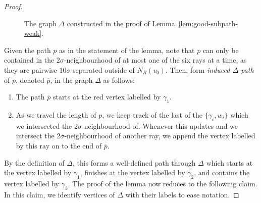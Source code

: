 \documentclass[11pt,a4paper]{amsart}
\theoremstyle{definition}
\begin{document}
\begin{proof}
\begin{figure}[ht]

        \caption{The graph $\Delta$ constructed in the proof of Lemma~\ref{lem:good-subpath-weak}.}
        \label{fig:graph-delta}
    \end{figure}

    Given the path $p$ as in the statement of the lemma, note that $p$ can only be contained in the $2\sigma$-neighbourhood of at most one of the six rays at a time, as they are pairwise $10\sigma$-separated outside of $N_R(v_0)$. 
    Then, form \emph{induced $\Delta$-path} of $p$, denoted $\overline p$, in the graph $\Delta$ as follows:
    \begin{enumerate}
        \item The path $\overline p$ starts at the red vertex labelled by $\gamma_1$.

        \item As we travel the length of $p$, we keep track of the last of the $\{\gamma_i, w_i\}$ which we intersected the $2\sigma$-neighbourhood of. 
            Whenever this updates and we intersect the $2\sigma$-neighbourhood of another ray, we append the vertex labelled by this ray on to the end of $\overline p$.
    \end{enumerate}
    By the definition of $\Delta$, this forms a well-defined path through $\Delta$ which starts at the vertex labelled by $\gamma_1$, finishes at the vertex labelled by $\gamma_2$, and contains the vertex labelled by $\gamma_3$. 
    The proof of the lemma now reduces to the following claim. In this claim, we identify vertices of $\Delta$ with their labels to ease notation.


\end{proof}
\end{document}
